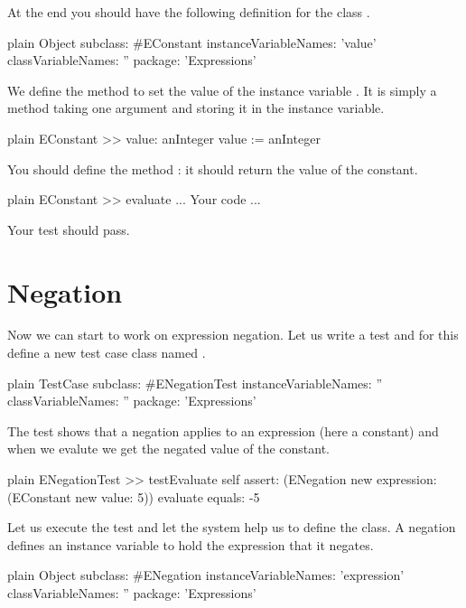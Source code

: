 \documentclass[10pt,twoside,english]{_support/latex/sbabook/sbabook}
\begin{document}
At the end you should have the following definition for the class .

\begin{displaycode}{plain}
Object subclass: #EConstant
	instanceVariableNames: 'value'
	classVariableNames: ''
	package: 'Expressions'
\end{displaycode}

We define the method  to set the value of the instance variable .
It is simply a method taking one argument and storing it in the  instance variable.

\begin{displaycode}{plain}
EConstant >> value: anInteger
	value := anInteger
\end{displaycode}

You should define the method : it should return the value of the constant. 

\begin{displaycode}{plain}
EConstant >> evaluate
	... Your code ...
\end{displaycode}

Your test should pass. 
\section{Negation}
Now we can start to work on expression negation. Let us write a test and for this define a new test case class named . 

\begin{displaycode}{plain}
TestCase subclass: #ENegationTest
	instanceVariableNames: ''
	classVariableNames: ''
	package: 'Expressions'
\end{displaycode}

The test  shows that a negation applies to an expression (here a constant) and when we evalute we get the negated value of the constant. 

\begin{displaycode}{plain}
ENegationTest >> testEvaluate 
	self assert: (ENegation new expression: (EConstant new value: 5)) evaluate equals: -5
\end{displaycode}

Let us execute the test and let the system help us to define the class. A negation defines an instance variable to hold the expression that it negates.

\begin{displaycode}{plain}
Object subclass: #ENegation
	instanceVariableNames: 'expression'
	classVariableNames: ''
	package: 'Expressions'
\end{displaycode}
\end{document}
